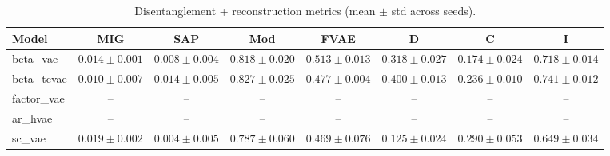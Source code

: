 \begin{table}[t]
\centering
\small
\begin{tabular}{lccccccc}
\toprule
Model & MIG & SAP & Mod & FVAE & D & C & I \\
\midrule
beta\_vae & $0.014 \pm 0.001$ & $0.008 \pm 0.004$ & $0.818 \pm 0.020$ & $0.513 \pm 0.013$ & $0.318 \pm 0.027$ & $0.174 \pm 0.024$ & $0.718 \pm 0.014$ \\
beta\_tcvae & $0.010 \pm 0.007$ & $0.014 \pm 0.005$ & $0.827 \pm 0.025$ & $0.477 \pm 0.004$ & $0.400 \pm 0.013$ & $0.236 \pm 0.010$ & $0.741 \pm 0.012$ \\
factor\_vae & -- & -- & -- & -- & -- & -- & -- \\
ar\_hvae & -- & -- & -- & -- & -- & -- & -- \\
sc\_vae & $0.019 \pm 0.002$ & $0.004 \pm 0.005$ & $0.787 \pm 0.060$ & $0.469 \pm 0.076$ & $0.125 \pm 0.024$ & $0.290 \pm 0.053$ & $0.649 \pm 0.034$ \\
\bottomrule
\end{tabular}
\caption{Disentanglement + reconstruction metrics (mean $\pm$ std across seeds).}
\label{tab:results}
\end{table}
